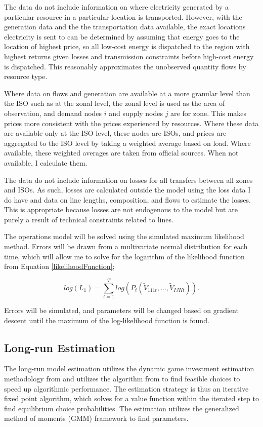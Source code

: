\documentclass[12pt]{article}
\begin{document}
The data do not include information on where electricity generated by a particular resource in a particular location is transported. However, with the generation data and the the transportation data available, the exact locations electricity is sent to can be determined by assuming that energy goes to the location of highest price, so all low-cost energy is dispatched to the region with highest returns given losses and transmission constraints before high-cost energy is dispatched. This reasonably approximates the unobserved quantity flows by resource type.

Where data on flows and generation are available at a more granular level than the ISO such as at the zonal level, the zonal level is used as the area of observation, and demand nodes $i$ and supply nodes $j$ are for zone. This makes prices more consistent with the prices experienced by resources. Where these data are available only at the ISO level, these nodes are ISOs, and prices are aggregated to the ISO level by taking a weighted average based on load. Where available, these weighted averages are taken from official sources. When not available, I calculate them.

The data do not include information on losses for all transfers between all zones and ISOs. As such, losses are calculated outside the model using the loss data I do have and data on line lengths, composition, and flows to estimate the losses. This is appropriate because losses are not endogenous to the model but are purely a result of technical constraints related to lines.

The operations model will be solved using the simulated maximum likelihood method. Errors will be drawn from a multivariate normal distribution for each time, which will allow me to solve for the logarithm of the likelihood function from Equation \ref{likelihoodFunction};

\begin{equation}
log(L_1)= \sum_{t=1}^T log(P_t(\tilde{V}_{111t},...,\tilde{V}_{IJKt})).
\end{equation}

Errors will be simulated, and parameters will be changed based on gradient descent until the maximum of the log-likelihood function is found.

\subsection{Long-run Estimation}

The long-run model estimation utilizes the dynamic game investment estimation methodology from \cite{pakes1998empirical} and utilizes the algorithm from \cite{gowrisankaran2024computable} to find feasible choices to speed up algorithmic performance. The estimation strategy is thus an iterative fixed point algorithm, which solves for a value function within the iterated step to find equilibrium choice probabilities. The estimation utilizes the generalized method of moments (GMM) framework to find parameters. 
\end{document}
